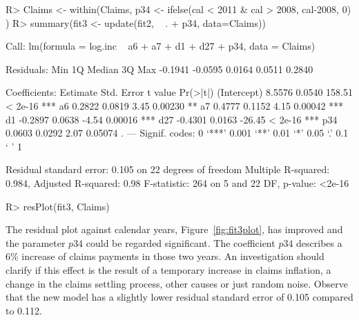 \documentclass{article}
\begin{document}
\begin{Schunk}
\begin{Sinput}
R> Claims <- within(Claims, { 
     p34 <- ifelse(cal < 2011 & cal > 2008, cal-2008, 0)
   })
R> summary(fit3 <- update(fit2, ~  . + p34, data=Claims))
\end{Sinput}
\begin{Soutput}
Call:
lm(formula = log.inc ~ a6 + a7 + d1 + d27 + p34, data = Claims)

Residuals:
    Min      1Q  Median      3Q     Max 
-0.1941 -0.0595  0.0164  0.0511  0.2840 

Coefficients:
            Estimate Std. Error t value Pr(>|t|)    
(Intercept)   8.5576     0.0540  158.51  < 2e-16 ***
a6            0.2822     0.0819    3.45  0.00230 ** 
a7            0.4777     0.1152    4.15  0.00042 ***
d1           -0.2897     0.0638   -4.54  0.00016 ***
d27          -0.4301     0.0163  -26.45  < 2e-16 ***
p34           0.0603     0.0292    2.07  0.05074 .  
---
Signif. codes:  0 ‘***’ 0.001 ‘**’ 0.01 ‘*’ 0.05 ‘.’ 0.1 ‘ ’ 1

Residual standard error: 0.105 on 22 degrees of freedom
Multiple R-squared:  0.984,	Adjusted R-squared:  0.98 
F-statistic:  264 on 5 and 22 DF,  p-value: <2e-16
\end{Soutput}
\end{Schunk}
\begin{Schunk}
\begin{Sinput}
R> resPlot(fit3, Claims)
\end{Sinput}
\end{Schunk}
The residual plot against calendar years, Figure~\ref{fig:fit3plot}, has 
improved and the parameter $p34$ could be regarded significant.
The coefficient $p34$ describes a 6\% increase of claims payments in those two 
years. An investigation should clarify if this effect is the result of a 
temporary increase in claims  inflation, a change in the claims settling 
process, other causes or just random noise.
Observe that the new model has a slightly lower residual standard error of 
0.105 compared to 0.112. 
\end{document}
